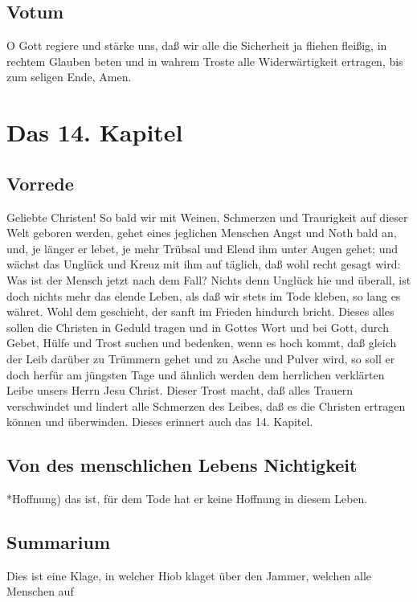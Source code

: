 \section{Votum}

O Gott regiere und stärke uns, daß wir alle die Sicherheit ja fliehen fleißig, in rechtem Glauben beten und in wahrem Troste alle Widerwärtigkeit ertragen, bis zum seligen Ende, Amen.

\chapter{Das 14. Kapitel}

\section{Vorrede}

Geliebte Christen! So bald wir mit Weinen, Schmerzen und Traurigkeit auf dieser Welt geboren werden, gehet eines jeglichen Menschen Angst und Noth bald an, und, je länger er lebet, je mehr Trübsal und Elend ihm unter Augen gehet; und wächst das Unglück und Kreuz mit ihm auf täglich, daß wohl recht gesagt wird: Was ist der Mensch jetzt nach dem Fall? Nichts denn Unglück hie und überall, ist doch nichts mehr das elende Leben, als daß wir stets im Tode kleben, so lang es währet. Wohl dem geschieht, der sanft im Frieden hindurch bricht. Dieses alles sollen die Christen in Geduld tragen und in Gottes Wort und bei Gott, durch Gebet, Hülfe und Trost suchen und bedenken, wenn es hoch kommt, daß gleich der Leib darüber zu Trümmern gehet und zu Asche und Pulver wird, so soll er doch herfür am jüngsten Tage und ähnlich werden dem herrlichen verklärten Leibe unsers Herrn Jesu Christ. Dieser Trost macht, daß alles Trauern verschwindet und lindert alle Schmerzen des Leibes, daß es die Christen ertragen können und überwinden. Dieses erinnert auch das 14. Kapitel.

\section{Von des menschlichen Lebens Nichtigkeit}

*Hoffnung) das ist, für dem Tode hat er keine Hoffnung in diesem Leben.

\section{Summarium}

Dies ist eine Klage, in welcher Hiob klaget über den Jammer, welchen alle Menschen auf

